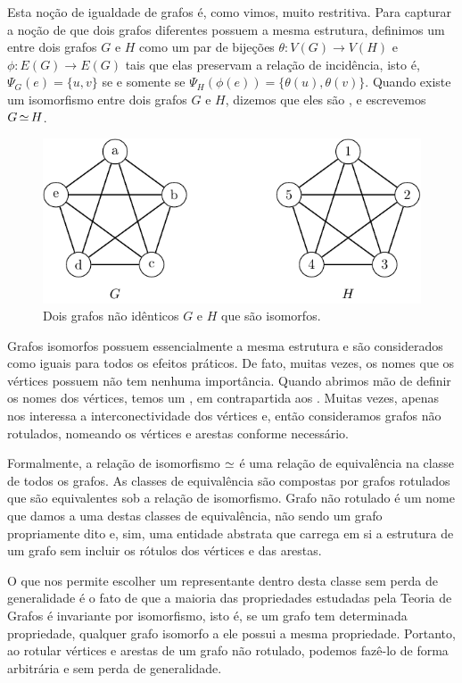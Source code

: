 Esta noção de igualdade de grafos é, como vimos, muito restritiva. Para capturar a noção de que dois grafos diferentes possuem a mesma estrutura, definimos um  entre dois grafos $G$ e $H$ como um par de bijeções $\theta : V(G) \to V(H)$ e $\phi : E(G) \to E(G)$ tais que elas preservam a relação de incidência, isto é, $\Psi_G(e) = \{u,v\}$ se e somente se $\Psi_H(\phi(e)) = \{\theta(u),\theta(v)\}$. Quando existe um isomorfismo entre dois grafos $G$ e $H$, dizemos que eles são , e escrevemos $G \operatorname{\simeq} H$.

\begin{figure}[ht!]
\centering
\includegraphics{figures/1_intro_2_iso}
\caption{Dois grafos não idênticos $G$ e $H$ que são isomorfos.}
\label{fig:intro:iso}
\end{figure}

Grafos isomorfos possuem essencialmente a mesma estrutura e são considerados como iguais para todos os efeitos práticos. De fato, muitas vezes, os nomes que os vértices possuem não tem nenhuma importância. Quando abrimos mão de definir os nomes dos vértices, temos um , em contrapartida aos . Muitas vezes, apenas nos interessa a interconectividade dos vértices e, então consideramos grafos não rotulados, nomeando os vértices e arestas conforme necessário.

Formalmente, a relação de isomorfismo $\operatorname{\simeq}$ é uma relação de equivalência na classe de todos os grafos. As classes de equivalência são compostas por grafos rotulados que são equivalentes sob a relação de isomorfismo. Grafo não rotulado é um nome que damos a uma destas classes de equivalência, não sendo um grafo propriamente dito e, sim, uma entidade abstrata que carrega em si a estrutura de um grafo sem incluir os rótulos dos vértices e das arestas.

O que nos permite escolher um representante dentro desta classe sem perda de generalidade é o fato de que a maioria das propriedades estudadas pela Teoria de Grafos é invariante por isomorfismo, isto é, se um grafo tem determinada propriedade, qualquer grafo isomorfo a ele possui a mesma propriedade. Portanto, ao rotular vértices e arestas de um grafo não rotulado, podemos fazê-lo de forma arbitrária e sem perda de generalidade.

